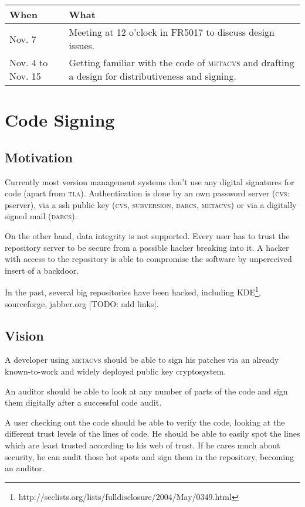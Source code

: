 \documentclass[german, 10pt, a4paper]{article}
\begin{document}
\begin{tabular}{|p{}|p{}|}
\hline
\textmd{When} & \textmd{What} \\
\hline\hline
Nov. 7 &
Meeting at 12 o'clock in FR5017 to discuss design issues. \\
\hline
Nov. 4 to Nov. 15 &
Getting familiar with the code of \textsc{metacvs}
and drafting a design for distributiveness and signing. \\
\hline
\end{tabular}

\section{Code Signing}

\subsection{Motivation}
Currently most version management systems don't use any digital signatures
for code (apart from \textsc{tla}). Authentication is done by an own password
server (\textsc{cvs}: pserver), via a ssh public key (\textsc{cvs},
\textsc{subversion}, \textsc{darcs}, \textsc{metacvs}) or
via a digitally signed mail (\textsc{darcs}).

On the other hand, data integrity is not supported.
Every user has to trust the repository server
to be secure from a possible hacker breaking into it.
A hacker with access to the repository is able to compromise the
software by unperceived insert of a backdoor.

In the past, several big repositories have been hacked, including
KDE\footnote{http://seclists.org/lists/fulldisclosure/2004/May/0349.html},
sourceforge, jabber.org [TODO: add links].


\subsection{Vision}
A developer using \textsc{metacvs} should be able to sign his patches via
an already known-to-work and widely deployed public key cryptosystem.

An auditor should be able to look at any number of parts of the code
and sign them digitally after a successful code audit.

A user checking out the code should be able to verify the code, looking
at the different trust levels of the lines of code.
He should be able to easily spot the lines
which are least trusted according to his web of trust. If he cares much
about security, he can audit those hot spots and sign them in the repository,
becoming an auditor.
\end{document}
